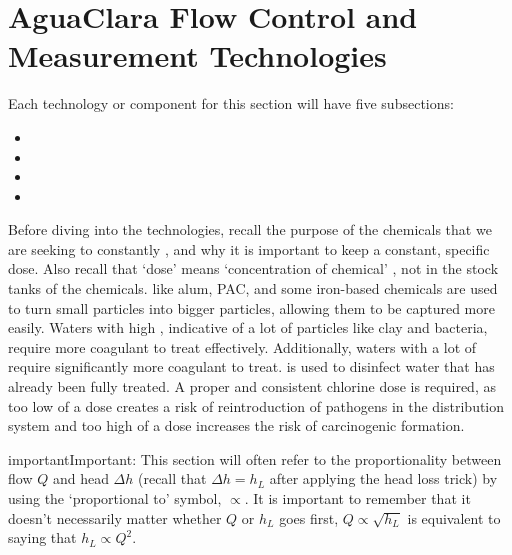 \documentclass[letterpaper,10pt,english]{sphinxmanual}
\begin{document}
\section{AguaClara Flow Control and Measurement Technologies}
\label{\detokenize{Flow_Control_and_Measurement/FCM_Design:aguaclara-flow-control-and-measurement-technologies}}\label{\detokenize{Flow_Control_and_Measurement/FCM_Design:id3}}
Each technology or component for this section will have five subsections:
\begin{itemize}
\item {} 

\item {} 

\item {} 

\item {} 

\end{itemize}

Before diving into the technologies, recall the purpose of the chemicals that we are seeking to constantly , and why it is important to keep a constant, specific dose. Also recall that ‘dose’ means ‘concentration of chemical’ , not in the stock tanks of the chemicals.  like alum, PAC, and some iron-based chemicals are used to turn small particles into bigger particles, allowing them to be captured more easily. Waters with high , indicative of a lot of particles like clay and bacteria, require more coagulant to treat effectively. Additionally, waters with a lot of  require significantly more coagulant to treat.  is used to disinfect water that has already been fully treated. A proper and consistent chlorine dose is required, as too low of a dose creates a risk of reintroduction of pathogens in the distribution system and too high of a dose increases the risk of carcinogenic  formation.

\begin{sphinxadmonition}{important}{Important:}
This section will often refer to the proportionality between flow \(Q\) and head \(\Delta h\) (recall that \(\Delta h = h_L\) after applying the head loss trick) by using the ‘proportional to’ symbol, \(\propto\). It is important to remember that it doesn’t necessarily matter whether \(Q\) or \(h_L\) goes first, \(Q \propto \sqrt{h_L}\) is equivalent to saying that \(h_L \propto Q^2\).
\end{sphinxadmonition}
\end{document}
